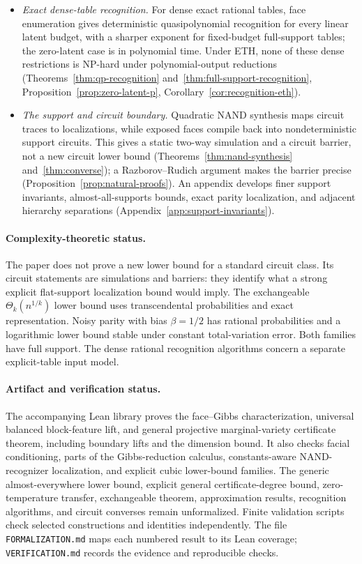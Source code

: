 \documentclass{article}
\begin{document}
\begin{itemize}
  \item \emph{Exact dense-table recognition.}
  For dense exact rational tables, face enumeration gives deterministic
  quasipolynomial recognition for every linear latent budget, with a sharper
  exponent for fixed-budget full-support tables; the zero-latent case is in
  polynomial time.  Under ETH, none of these dense restrictions is NP-hard
  under polynomial-output reductions
  (Theorems~\ref{thm:qp-recognition} and~\ref{thm:full-support-recognition},
  Proposition~\ref{prop:zero-latent-p},
  Corollary~\ref{cor:recognition-eth}).
  \item \emph{The support and circuit boundary.}
  Quadratic NAND synthesis maps circuit traces to localizations, while exposed
  faces compile back into nondeterministic support circuits.  This gives a
  static two-way simulation and a circuit barrier, not a new circuit lower
  bound (Theorems~\ref{thm:nand-synthesis} and~\ref{thm:converse}); a
  Razborov--Rudich argument makes the barrier precise
  (Proposition~\ref{prop:natural-proofs}).  An appendix develops finer
  support invariants, almost-all-supports bounds, exact parity localization,
  and adjacent hierarchy separations (Appendix~\ref{app:support-invariants}).
\end{itemize}

\paragraph{Complexity-theoretic status.}
The paper does not prove a new lower bound for a standard circuit class.  Its
circuit statements are simulations and barriers: they identify what a strong
explicit flat-support localization bound would imply.  The exchangeable
$\Theta_k(n^{1/k})$ lower bound uses transcendental probabilities and exact
representation.  Noisy parity with bias $\beta=1/2$ has rational probabilities and a
logarithmic lower bound stable under constant total-variation error.  Both
families have full support.  The dense rational recognition algorithms concern
a separate explicit-table input model.

\paragraph{Artifact and verification status.}
The accompanying Lean library proves the face--Gibbs characterization,
universal balanced block-feature lift, and general projective marginal-variety
certificate theorem, including boundary lifts and the dimension bound.  It
also checks facial conditioning, parts of the Gibbs-reduction calculus,
constants-aware NAND-recognizer localization, and explicit cubic lower-bound
families.  The generic almost-everywhere lower bound, explicit general
certificate-degree bound, zero-temperature transfer, exchangeable theorem,
approximation results, recognition algorithms, and circuit converses remain
unformalized.  Finite
validation scripts check selected constructions and identities independently.
The file \texttt{FORMALIZATION.md} maps each numbered result to its Lean
coverage; \texttt{VERIFICATION.md} records the evidence and reproducible checks.
\end{document}
